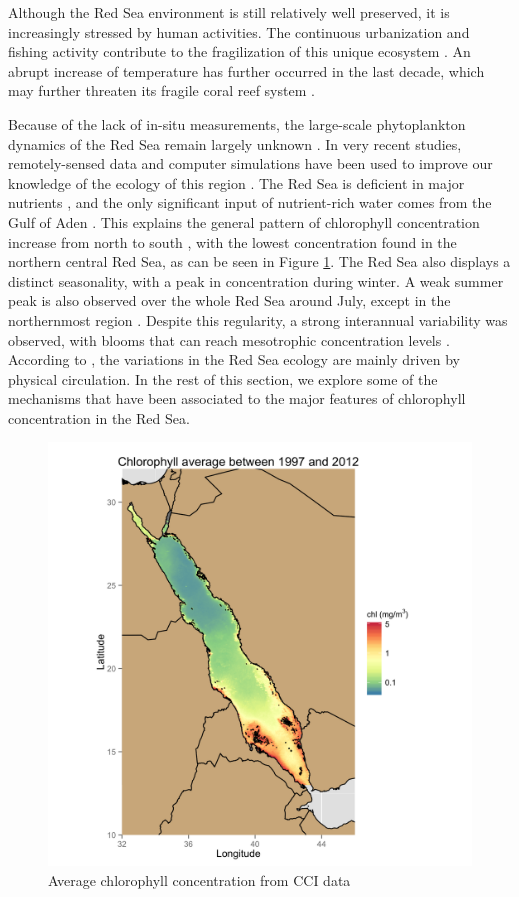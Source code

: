 Although the Red Sea environment is still relatively well preserved, it is
increasingly stressed by human activities. The continuous urbanization and
fishing activity contribute to the fragilization of this unique ecosystem
\citep{Acker2008}. An abrupt increase of temperature has further occurred in
the last decade, which may further threaten its fragile coral reef system
\citep{Raitsos2011}.

Because of the lack of in-situ measurements, the large-scale phytoplankton
dynamics of the Red Sea remain largely unknown \citep{Raitsos2013,
Triantafyllou2014}. In very recent studies, remotely-sensed data and computer
simulations have been used to improve our knowledge of the ecology of this
region \citep{Raitsos2013, Racault, Triantafyllou2013}. The Red Sea is
deficient in major nutrients \citep{Weikert1987}, and the only significant
input of nutrient-rich water comes from the Gulf of Aden \citep{Yao2015}. This
explains the general pattern of chlorophyll concentration increase from north
to south \citep{Raitsos2013}, with the lowest concentration found in the
northern central Red Sea, as can be seen in Figure \ref{meanchl}.  The Red Sea
also displays a distinct seasonality, with a peak in concentration during
winter.  A weak summer peak is also observed over the whole Red Sea around
July, except in the northernmost region \citep{Raitsos2013}. Despite this
regularity, a strong interannual variability was observed, with blooms that can
reach mesotrophic concentration levels \citep{Raitsos2013}. According to
\citet{Triantafyllou2014}, the variations in the Red Sea ecology are mainly
driven by physical circulation. In the rest of this section, we explore some of
the mechanisms that have been associated to the major features of chlorophyll
concentration in the Red Sea.

\begin{figure}[h]
    \centering
    \includegraphics[scale=.15]{figures/chl_average.png}
    \caption{Average chlorophyll concentration from CCI data}
    \label{meanchl}
\end{figure}

